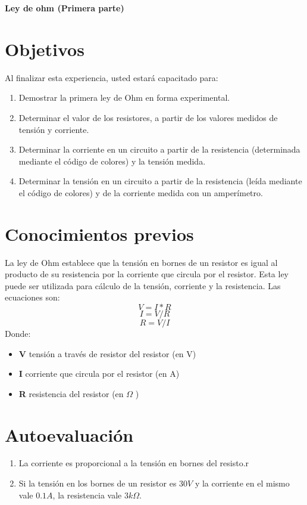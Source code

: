 \thispagestyle{fancy}
\begin{center}
	\LARGE{\textbf{Ley de ohm (Primera parte)}}
\end{center}
\section{Objetivos}
Al finalizar esta experiencia, usted estará capacitado para:
\begin{enumerate}
	\item Demostrar la primera ley de Ohm en forma experimental.
	\item Determinar el valor de los resistores, a partir de los valores medidos de tensión y corriente.
	\item Determinar la corriente en un circuito a partir de la resistencia (determinada mediante el código de colores) y la tensión medida.
	\item Determinar la tensión en un circuito a partir de la resistencia (leída mediante el código de colores) y de la corriente medida con un amperímetro.
\end{enumerate}

\section{Conocimientos previos}
La ley de Ohm establece que la tensión en bornes de un resistor es igual al producto de su resistencia por la corriente que circula por el resistor.
Esta ley puede ser utilizada para cálculo de la tensión, corriente y la resistencia. 
Las ecuaciones son:
\begin{equation*}
	V=I*R 
\end{equation*}
\begin{equation*}
	I=V/R
\end{equation*}
\begin{equation*}
	R=V/I
\end{equation*}
Donde:
\begin{itemize}
	\item \textbf{V} tensión a través de resistor del resistor (en V)
	\item \textbf{I} corriente que circula por el resistor (en A) 
	\item \textbf{R} resistencia del resistor (en $\Omega $ )
\end{itemize}

\section{Autoevaluación}
\begin{enumerate}
	\item La corriente es proporcional a la tensión en bornes del resisto.r
	\item Si la tensión en los bornes de un resistor es $30 V$ y la corriente en el mismo vale $0.1A$, la resistencia vale $3k\Omega$.
\end{enumerate}

